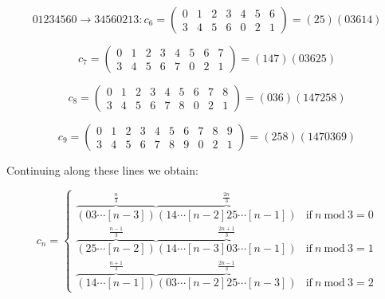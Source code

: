 \documentclass[a4paper,10pt]{article}
\begin{document}
\begin{equation}
01234560\rightarrow34560213:c_6=
\begin{pmatrix}
0&1&2&3&4&5&6\\
3&4&5&6&0&2&1
\end{pmatrix} = (25)(03614)
\end{equation}

\begin{equation}c_7=
\begin{pmatrix}
0&1&2&3&4&5&6&7\\
3&4&5&6&7&0&2&1
\end{pmatrix} = (147)(03625)
\end{equation}

\begin{equation}
c_8=
\begin{pmatrix}
0&1&2&3&4&5&6&7&8\\
3&4&5&6&7&8&0&2&1
\end{pmatrix} = (036)(147258)
\end{equation}

\begin{equation}
c_9=
\begin{pmatrix}
0&1&2&3&4&5&6&7&8&9\\
3&4&5&6&7&8&9&0&2&1
\end{pmatrix} = (258)(1470369)
\end{equation}

Continuing along these lines we obtain:

\begin{equation}
c_n = \left\{
\begin{array}{ll}
\overbrace{(03\cdots[n-3])}^{\frac{n}{3}}\overbrace{(14\cdots[n-2]25\cdots[n-1])}^{\frac{2n}{3}}&\textrm{if}~n~\textrm{mod}~3=0\\
\overbrace{(25\cdots[n-2])}^{\frac{n-1}{3}}\overbrace{(14\cdots[n-3]03\cdots[n-1])}^{\frac{2n+1}{3}} &\textrm{if}~n~\textrm{mod}~3=1\\
\overbrace{(14\cdots[n-1])}^{\frac{n+1}{3}}\overbrace{(03\cdots[n-2]25\cdots[n-3])}^{\frac{2n-1}{3}} &\textrm{if}~n~\textrm{mod}~3=2 
\end{array}
\right.
\end{equation}

% 
% 
% 
\end{document}
